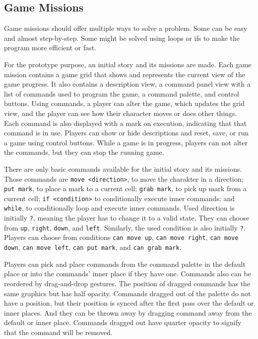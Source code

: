 \subsection{Game Missions}
\label{analysis:game:game-missions}

Game missions should offer multiple ways to solve a problem.
Some can be easy and almost step-by-step.
Some might be solved using loops or ifs to make the program more efficient or fast.

For the prototype purpose, an initial story and its missions are made.
Each game mission contains a game grid that shows and represents the current view of the game progress.
It also contains a description view, a command panel view with a list of commands used to program the game, a command palette, and control buttons.
Using commands, a player can alter the game, which updates the grid view, and the player can see how their character moves or does other things.
Each command is also displayed with a mark on execution, indicating that that command is in use.
Players can show or hide descriptions and reset, save, or run a game using control buttons.
While a game is in progress, players can not alter the commands, but they can stop the running game. 

There are only basic commands available for the initial story and its missions.
Those commands are \texttt{move <direction>}, to move the charakter in a direction; \texttt{put mark}, to place a mark to a current cell; \texttt{grab mark}, to pick up mark from a current cell; \texttt{if <condition>} to conditionally execute inner commands; and \texttt{while}, to conditionally loop and execute inner commands.
Used direction is initially \texttt{?}, meaning the player has to change it to a valid state.
They can choose from \texttt{up}, \texttt{right}, \texttt{down}, and \texttt{left}.
Similarly, the used condition is also initially \texttt{?}.
Players can choose from conditions \texttt{can move up}, \texttt{can move right}, \texttt{can move down}, \texttt{can move left}, \texttt{can put mark}, and \texttt{can grab mark}.

Players can pick and place commands from the command palette in the default place or into the commands' inner place if they have one.
Commands also can be reordered by drag-and-drop gestures.
The position of dragged commands has the same graphics but has half opacity.
Commands dragged out of the palette do not have a position, but their position is synced after the first pass over the default or inner places.
And they can be thrown away by dragging command away from the default or inner place.
Commands dragged out have quarter opacity to signify that the command will be removed.

